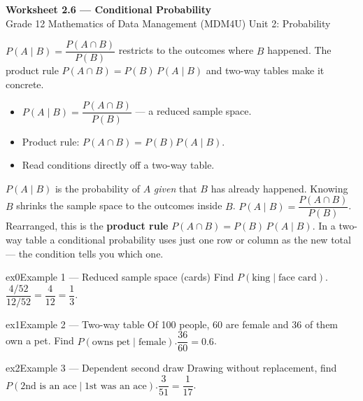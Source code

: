 \documentclass[11pt]{article}
\begin{document}
\begin{center}
{\LARGE\bfseries\color{titleblue}Worksheet 2.6 --- Conditional Probability}\\[2pt]
{\small Grade 12 Mathematics of Data Management (MDM4U) \textperiodcentered{} Unit 2: Probability}
\end{center}

\begin{ideabox}
$P(A\mid B)=\dfrac{P(A\cap B)}{P(B)}$ restricts to the outcomes where $B$ happened. The product rule $P(A\cap B)=P(B)\,P(A\mid B)$ and two-way tables make it concrete.
\begin{itemize}[leftmargin=*,itemsep=2pt]
  \item $P(A\mid B)=\dfrac{P(A\cap B)}{P(B)}$ --- a reduced sample space.
  \item Product rule: $P(A\cap B)=P(B)P(A\mid B)$.
  \item Read conditions directly off a two-way table.
\end{itemize}
\end{ideabox}

\begin{learnbox}
$P(A\mid B)$ is the probability of $A$ \emph{given} that $B$ has already happened. Knowing $B$ shrinks the sample space to the outcomes inside $B$.
$P(A\mid B)=\dfrac{P(A\cap B)}{P(B)}$. Rearranged, this is the \textbf{product rule} $P(A\cap B)=P(B)\,P(A\mid B)$.
In a two-way table a conditional probability uses just one row or column as the new total — the condition tells you which one.
\end{learnbox}


\begin{example}{ex0}{Example 1 --- Reduced sample space (cards)}
Find $P(\text{king}\mid\text{face card})$.\soln $\dfrac{4/52}{12/52}=\dfrac{4}{12}=\dfrac13$.
\end{example}

\begin{example}{ex1}{Example 2 --- Two-way table}
Of 100 people, 60 are female and 36 of them own a pet. Find $P(\text{owns pet}\mid\text{female})$.\soln $\dfrac{36}{60}=0.6$.
\end{example}

\begin{example}{ex2}{Example 3 --- Dependent second draw}
Drawing without replacement, find $P(\text{2nd is an ace}\mid\text{1st was an ace})$.\soln $\dfrac{3}{51}=\dfrac{1}{17}$.
\end{example}
\end{document}
